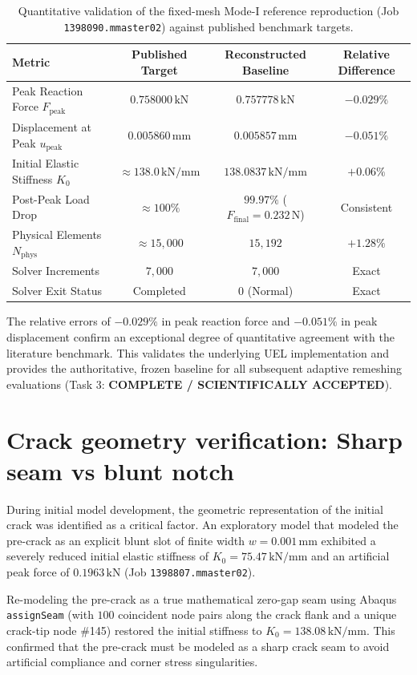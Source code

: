 \begin{table}[htbp]
\centering
\caption{Quantitative validation of the fixed-mesh Mode-I reference reproduction (Job \texttt{1398090.mmaster02}) against published benchmark targets.}
\label{tab:baseline_comparison}
\begin{tabular}{lccc}
\toprule
\textbf{Metric} & \textbf{Published Target} \citep{Pandey2025} & \textbf{Reconstructed Baseline} & \textbf{Relative Difference} \\
\midrule
Peak Reaction Force $F_{\text{peak}}$ & $0.758000\,\mathrm{kN}$ & $0.757778\,\mathrm{kN}$ & $\mathbf{-0.029\%}$ \\
Displacement at Peak $u_{\text{peak}}$ & $0.005860\,\mathrm{mm}$ & $0.005857\,\mathrm{mm}$ & $\mathbf{-0.051\%}$ \\
Initial Elastic Stiffness $K_0$ & $\approx 138.0\,\mathrm{kN/mm}$ & $138.0837\,\mathrm{kN/mm}$ & $+0.06\%$ \\
Post-Peak Load Drop & $\approx 100\%$ & $99.97\%$ ($F_{\text{final}} = 0.232\,\mathrm{N}$) & Consistent \\
Physical Elements $N_{\mathrm{phys}}$ & $\approx 15{,}000$ & $15{,}192$ & $+1.28\%$ \\
Solver Increments & $7{,}000$ & $7{,}000$ & Exact \\
Solver Exit Status & Completed & $0$ (Normal) & Exact \\
\bottomrule
\end{tabular}
\end{table}

The relative errors of $-0.029\%$ in peak reaction force and $-0.051\%$ in peak displacement confirm an exceptional degree of quantitative agreement with the literature benchmark. This validates the underlying UEL implementation and provides the authoritative, frozen baseline for all subsequent adaptive remeshing evaluations (Task 3: \textbf{COMPLETE / SCIENTIFICALLY ACCEPTED}).

\section{Crack geometry verification: Sharp seam vs blunt notch}
During initial model development, the geometric representation of the initial crack was identified as a critical factor. An exploratory model that modeled the pre-crack as an explicit blunt slot of finite width $w = 0.001\,\mathrm{mm}$ exhibited a severely reduced initial elastic stiffness of $K_0 = 75.47\,\mathrm{kN/mm}$ and an artificial peak force of $0.1963\,\mathrm{kN}$ (Job \texttt{1398807.mmaster02}). 

Re-modeling the pre-crack as a true mathematical zero-gap seam using Abaqus \texttt{assignSeam} (with $100$ coincident node pairs along the crack flank and a unique crack-tip node \#145) restored the initial stiffness to $K_0 = 138.08\,\mathrm{kN/mm}$. This confirmed that the pre-crack must be modeled as a sharp crack seam to avoid artificial compliance and corner stress singularities.
